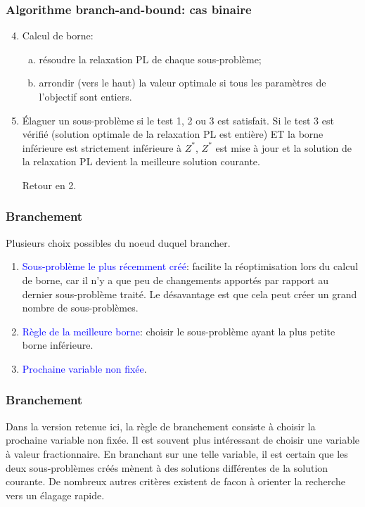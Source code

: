 \documentclass[usepdftitle=false, aspectratio=169]{beamer}
\begin{document}
\begin{frame}
\frametitle{Algorithme branch-and-bound: cas binaire}

\begin{enumerate}
\setcounter{enumi}{3}
\item
Calcul de borne:
\begin{enumerate}[(a)]
	\item
	résoudre la relaxation PL de chaque sous-problème;
	\item
	arrondir (vers le haut) la valeur optimale si tous les paramètres de l'objectif sont entiers.
\end{enumerate}
\item
Élaguer un sous-problème si le test 1, 2 ou 3 est satisfait. Si le test 3 est vérifié (solution optimale de la relaxation PL est entière) ET la borne inférieure est strictement inférieure à $Z^*$, $Z^*$ est mise à jour et la solution de la relaxation PL devient la meilleure solution courante.

Retour en 2.
\end{enumerate}

\end{frame}

\begin{frame}
\frametitle{Branchement}

Plusieurs choix possibles du noeud duquel brancher.

\mbox{}

\begin{enumerate}
	\item 
\textcolor{blue}{Sous-problème le plus récemment créé}: facilite la réoptimisation lors du calcul de borne, car il n'y a que peu de changements apportés par rapport au dernier sous-problème traité.
Le désavantage est que cela peut créer un grand nombre de sous-problèmes.
	\item 
\textcolor{blue}{Règle de la meilleure borne}: choisir le sous-problème ayant la plus petite borne inférieure.
	\item 
\textcolor{blue}{Prochaine variable non fixée}.
\end{enumerate}

\end{frame}

\begin{frame}
\frametitle{Branchement}

Dans la version retenue ici, la règle de branchement consiste à choisir la prochaine variable non fixée. Il est souvent plus intéressant de choisir une variable à valeur fractionnaire.
En branchant sur une telle variable, il est certain que les deux sous-problèmes créés mènent à des solutions différentes de la solution courante.
De nombreux autres critères existent de facon à orienter la recherche vers un élagage rapide.

\end{frame}
\end{document}
